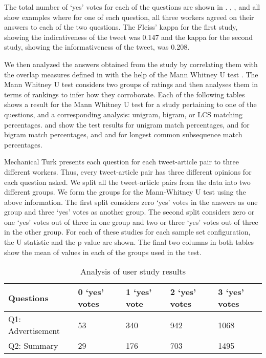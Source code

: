 The total number of `yes' votes for each of the questions are shown in . , ,  and  all show examples where for one of each question, all three workers agreed on their answers to each of the two questions. The Fleiss' kappa for the first study, showing the indicativeness of the tweet was 0.147 and the kappa for the second study, showing the informativeness of the tweet, was 0.208.



We then analyzed the answers obtained from the study by correlating them with the overlap measures defined in  with the help of the Mann Whitney U test \citep{mann1947test,wilcoxon1947probability}. The Mann Whitney U test considers two groups of ratings and then analyses them in terms of rankings to infer how they corroborate. Each of the following tables shows a result for the Mann Whitney U test for a study pertaining to one of the questions, and a corresponding analysis: unigram, bigram, or LCS matching percentages.  and  show the test results for unigram match percentages,  and  for bigram match percentages, and  and  for longest common subsequence match percentages. 

Mechanical Turk presents each question for each tweet-article pair to three different workers. Thus, every tweet-article pair has three different opinions for each question asked. We split all the tweet-article pairs from the data into two different groups. We form the groups for the Mann-Whitney U test using the above information. The first split considers zero `yes' votes in the answers as one group and three `yes' votes as another group. The second split considers zero or  one `yes' votes out of three in one group and two or three `yes' votes out of three in the other group. For each of these studies for each sample set configuration, the U statistic and the p value are shown. The final two columns in both tables show the mean of values in each of the groups used in the test. 


\begin{table}[!t]
\centering
\begin{tabular}{|l|l|l|l|l|}
\hline
\textbf{Questions}     & \textbf{0 `yes' votes} & \textbf{1 `yes' vote} & \textbf{2 `yes' votes} & \textbf{3 `yes' votes}\\ \hline
Q1: Advertisement & 53    & 340    & 942     &  1068  \\ \hline
Q2: Summary       & 29     & 176    & 703     & 1495    \\ \hline
\end{tabular}
\caption{Analysis of user study results}
\label{tab:yeses}
\end{table}


